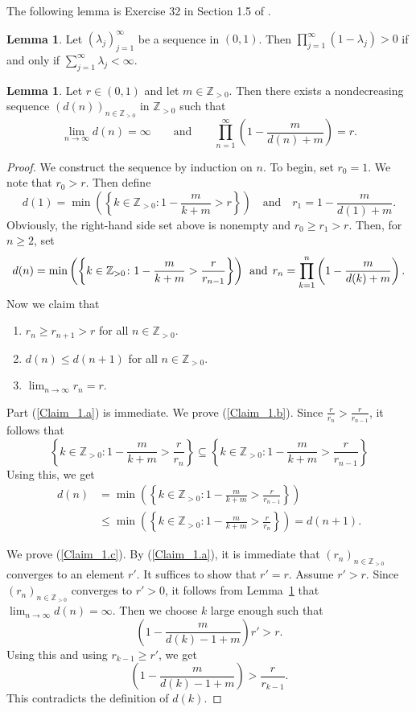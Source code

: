 \documentclass[10pt]{amsart}
\numberwithin{equation}{section}
\theoremstyle{definition}
\newtheorem{lem}[thm]{Lemma}
\newcommand{\N}{{\mathbb{Z}}_{> 0}}
\begin{document}
The following lemma is Exercise 32 in Section 1.5 of  \cite{FR99}.
\begin{lem}\label{Folland_Exr}
Let  $(\lambda_j)_{j=1}^{\infty}$ be a sequence in $(0, 1)$. Then
 $\prod_{j=1}^{\infty} (1 - \lambda_j)>0$
if and only if $\sum_{j=1}^{\infty} \lambda_j < \infty$.

\end{lem}
%
\begin{lem}\label{Special_seq}
Let $r \in (0, 1)$ and let $m \in \N$. Then there exists a nondecreasing sequence 
$(d(n))_{n \in \N}$ in $\N$ such that 
\[
\lim_{n \to \infty} d(n)= \infty
\qquad
\mbox{and}
\qquad
\prod_{n= 1}^{\infty} \left( 1 -  \frac{m}{d(n)+m} \right) = r.
\]
\end{lem}
%
\begin{proof}
We construct the sequence by induction on $n$. 
To begin,
 set $r_0=1$. We note that $r_0>r$. Then define
\[
 d(1)= \min \left( \left\{k \in \N \colon 1 - \frac{m}{k+ m} > r \right\} \right)
\quad
\mbox{and}
\quad 
r_1= 1- \frac{m}{d(1)+ m}.
\]
Obviously, the right-hand side set above is nonempty and  $r_0 \geq r_1>r$.
 Then, for $n\geq 2$, set 
\begin{equation*}
d(n)= \min \left( 
\left\{
k \in \N \colon  1 -  \frac{m}{k+ m} > \frac{r}{r_{n-1}} 
\right\} 
\right) 
\hspace*{.1em}
\mbox{ and }
\hspace*{.1em} 
r_{n}= 
\prod_{k=1}^{n} \left(1- \frac{m}{d(k)+ m}\right).
\end{equation*}
Now we claim that
\begin{enumerate}
\item\label{Claim_1.a}
$r_{n} \geq r_{n+1}> r$ for all $n \in \N$.
\item\label{Claim_1.b}
$d(n) \leq d(n+1)$ for all $n \in \N$.
\item\label{Claim_1.c}
$\lim_{n\to \infty} r_n = r$.
\end{enumerate}
Part (\ref{Claim_1.a}) is immediate. We prove (\ref{Claim_1.b}). Since 
$\frac{r}{r_{n}} > \frac{r}{r_{n-1}}$, it follows that
\[
\left\{
k \in \N \colon  1 -  \frac{m}{k+ m} > \frac{r}{r_{n}} 
\right\}
\subseteq
\left\{
k \in \N \colon  1 -  \frac{m}{k+ m} > \frac{r}{r_{n-1}} 
\right\} 
\]
Using this, we get
\begin{align*}
d(n) 
&= 
\min \left(
\left\{
k \in \N \colon  1 -  \frac{m}{k+ m} > \frac{r}{r_{n-1}} 
\right\}
\right)
\\&
\leq
\min \left(
\left\{
k \in \N \colon  1 -  \frac{m}{k+ m} > \frac{r}{r_{n}} 
\right\}
\right)
 =d(n+1).
\end{align*}

We prove (\ref{Claim_1.c}). By (\ref{Claim_1.a}), it is immediate that $(r_n)_{n \in \N}$ converges to an element $r'$.
It suffices to show that $r'=r$.
 Assume $r'>r$. 
 Since $(r_n)_{n \in \N}$ converges to $r'>0$, 
 it follows from Lemma~\ref{Folland_Exr} that $\lim_{n \to \infty} d(n)= \infty$.
Then we choose $k$ large enough such that
\[
\left(1- \frac{m}{d(k) - 1+ m}\right)r'> r.
\]
Using this and using $r_{k-1}\geq r'$, we get 
\[
 \left(1- \frac{m}{d(k) - 1+ m}\right)> \frac{r}{r_{k-1}}.
\]
This contradicts the definition of $d(k)$.
\end{proof}
\end{document}
